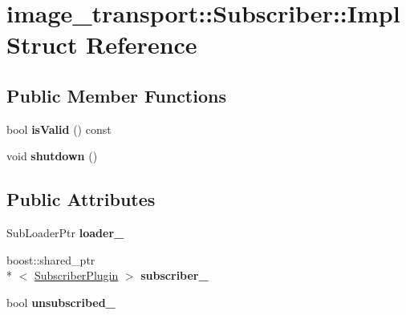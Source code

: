 \hypertarget{structimage__transport_1_1_subscriber_1_1_impl}{\section{image\-\_\-transport\-:\-:Subscriber\-:\-:Impl Struct Reference}
\label{structimage__transport_1_1_subscriber_1_1_impl}
}
\subsection*{Public Member Functions}
\begin{DoxyCompactItemize}
\item 
\hypertarget{structimage__transport_1_1_subscriber_1_1_impl_ab866a0f379c5d0624ffde622f8110ba2}{bool {\bfseries is\-Valid} () const }\label{structimage__transport_1_1_subscriber_1_1_impl_ab866a0f379c5d0624ffde622f8110ba2}

\item 
\hypertarget{structimage__transport_1_1_subscriber_1_1_impl_abb17966d1360dcd587022eb2a01b6473}{void {\bfseries shutdown} ()}\label{structimage__transport_1_1_subscriber_1_1_impl_abb17966d1360dcd587022eb2a01b6473}

\end{DoxyCompactItemize}
\subsection*{Public Attributes}
\begin{DoxyCompactItemize}
\item 
\hypertarget{structimage__transport_1_1_subscriber_1_1_impl_a1b52f135012fd633ad207fde49d5fd33}{Sub\-Loader\-Ptr {\bfseries loader\-\_\-}}\label{structimage__transport_1_1_subscriber_1_1_impl_a1b52f135012fd633ad207fde49d5fd33}

\item 
\hypertarget{structimage__transport_1_1_subscriber_1_1_impl_a841399336baa7248a2717880f9daa145}{boost\-::shared\-\_\-ptr\\*
$<$ \hyperlink{classimage__transport_1_1_subscriber_plugin}{Subscriber\-Plugin} $>$ {\bfseries subscriber\-\_\-}}\label{structimage__transport_1_1_subscriber_1_1_impl_a841399336baa7248a2717880f9daa145}

\item 
\hypertarget{structimage__transport_1_1_subscriber_1_1_impl_a929b85bd75ba4724fb372552aea246c3}{bool {\bfseries unsubscribed\-\_\-}}\label{structimage__transport_1_1_subscriber_1_1_impl_a929b85bd75ba4724fb372552aea246c3}

\end{DoxyCompactItemize}


